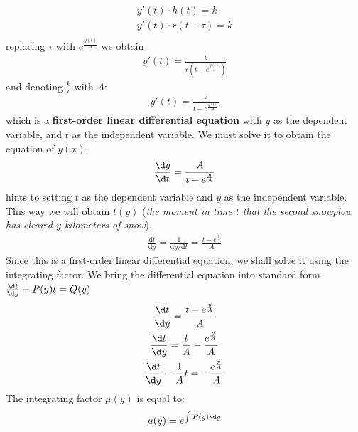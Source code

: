 \documentclass[a4paper,12pt]{article}
\begin{document}
\begin{itemize}
            \begin{gather*}
                y'(t) \cdot h(t) = k \\
                y'(t) \cdot r(t-\tau) = k \\
            \end{gather*}
            replacing $\tau$ with \(e^{\frac{y(t)}{A}}\) we obtain
            \begin{gather*}
                y'(t) = \frac{k}{r(t-e^{\frac{y(t)}{A}})}
            \end{gather*}
            and denoting \(\frac{k}{r}\) with \(A\):
            \begin{gather*}
                y'(t) = \frac{A}{t - e^{\frac{y(t)}{A}}}
            \end{gather*}
            which is a \textbf{first-order linear differential equation} with \(y\) as the dependent variable, and \(t\) as the independent variable. We must solve it to obtain the equation of \(y(x)\).
            \begin{gather*}
                \frac{\d y}{\d t} = \frac{A}{t - e^{\frac{y}{A}}} \\
            \end{gather*}
            \cite{Kent_Nagle2018-ig} hints to setting \(t\) as the dependent variable and \(y\) as the independent variable. This way we will obtain \(t(y)\) (\emph{the moment in time $t$ that the second snowplow has cleared $y$ kilometers of snow}).
            \begin{gather*}
                \frac{\mathrm{d}t}{\mathrm{d}y} = \frac{1}{\mathrm{d}y / \mathrm{d}t} = \frac{t - e^{\frac{y}{A}}}{A}
            \end{gather*}
            Since this is a first-order linear differential equation, we shall solve it using the integrating factor. We bring the differential equation into standard form \(\frac{\d t}{\d y} + P(y)t = Q(y)\)
            \begin{gather*}
                \frac{\d t}{\d y} = \frac{t - e^{\frac{y}{A}}}{A} \\
                \frac{\d t}{\d y} = \frac{t}{A} - \frac{e^{\frac{y}{A}}}{A} \\
                \frac{\d t}{\d y} - \frac{1}{A}t = - \frac{e^{\frac{y}{A}}}{A}
            \end{gather*}
            The integrating factor \(\mu(y)\) is equal to:
            \begin{gather*}
                \mu(y) = e^{\int P(y) \d y} \\

\end{gather*}
\end{itemize}
\end{document}
